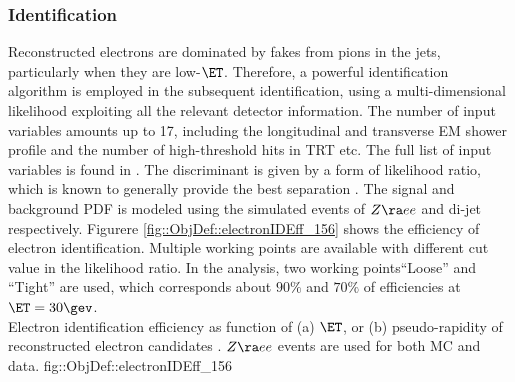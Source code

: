 


\subsubsection{Identification} \label{sec::objDef::electrons::id}
Reconstructed electrons are dominated by fakes from pions in the jets, particularly when they are low-$\ET$. Therefore, a powerful identification algorithm is employed in the subsequent identification, using a multi-dimensional likelihood exploiting all the relevant detector information. The number of input variables amounts up to 17, including the longitudinal and transverse EM shower profile and the number of high-threshold hits in TRT etc. The full list of input variables is found in \cite{156_ElectronEffMeas_2015data}.
The discriminant is given by a form of likelihood ratio, which is known to generally provide the best separation \cite{NPLemma}.
The signal and background PDF is modeled using the simulated events of $Z\ra ee$ and di-jet respectively.
Figurere \ref{fig::ObjDef::electronIDEff_156} shows the efficiency of electron identification.
Multiple working points are available with different cut value in the likelihood ratio. 
In the analysis, two working points``Loose'' and ``Tight'' are used, which corresponds about $90\%$ and $70\%$ of efficiencies at $\ET = 30\gev$. \\

{Electron identification efficiency as function of (a) $\ET$, or (b) pseudo-rapidity of reconstructed electron candidates \cite{156_ElectronEffMeas_2015data}. $Z\ra ee$ events are used for both MC and data.}
{fig::ObjDef::electronIDEff_156}







